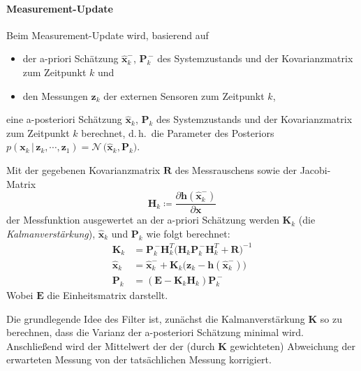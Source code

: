 \documentclass[a4paper, 11pt, accentcolor = tud3b]{tudreport}
\newcommand{\given}{\,\vert\,}
\newcommand{\mat}[1]{\boldsymbol{#1}}
\renewcommand{\vec}[1]{\boldsymbol{#1}}
\renewcommand{\dh}{d.\,h.~}
\begin{document}
					\paragraph{Measurement-Update} %
						Beim Measurement-Update wird, basierend auf
						\begin{itemize}
							\item der a-priori Schätzung \( \hat{\vec{x}}_k^- \), \( \mat{P}_k^{\,-} \) des Systemzustands und der Kovarianzmatrix zum Zeitpunkt \(k\) und
							\item den Messungen \( \vec{z}_k \) der externen Sensoren zum Zeitpunkt \(k\),
						\end{itemize}
						eine a-posteriori Schätzung \( \hat{\vec{x}}_k \), \( \mat{P}_k \) des Systemzustands und der Kovarianzmatrix zum Zeitpunkt \(k\) berechnet, \dh die Parameter des Posteriors \( p(\vec{x}_k \given \vec{z}_k, \cdots, \vec{z}_1) = \mathcal{N}\,\big(\hat{\vec{x}}_k, \mat{P}_k\big) \).
						
						Mit der gegebenen Kovarianzmatrix \( \mat{R} \) des Messrauschens sowie der Jacobi-Matrix
						\begin{equation*}
							\mat{H}_k \coloneqq \frac{\partial \vec{h}(\hat{\vec{x}}_k^-)}{\partial \vec{x}}
						\end{equation*}
						der Messfunktion ausgewertet an der a-priori Schätzung werden \( \mat{K}_k \) (die \emph{Kalmanverstärkung}), \( \hat{\vec{x}}_k \) und \( \mat{P}_k \) wie folgt berechnet:
						\begin{align*}
							\mat{K}_k &= \mat{P}_k^{\,-} \mat{H}_k^T \big( \mat{H}_k \mat{P}_k^{\,-} \mat{H}_k^T + \mat{R} \big)^{-1} \\
							\hat{\vec{x}}_k &= \hat{\vec{x}}_k^- + \mat{K}_k \big( \vec{z}_k - \vec{h}(\hat{\vec{x}}_k^-) \big) \\
							\mat{P}_k &= (\mat{E} - \mat{K}_k \mat{H}_k) \mat{P}_k^{\,-}
						\end{align*}
						Wobei \( \mat{E} \) die Einheitsmatrix darstellt.
						
						Die grundlegende Idee des Filter ist, zunächst die Kalmanverstärkung \( \mat{K} \) so zu berechnen, dass die Varianz der a-posteriori Schätzung minimal wird. Anschließend wird der Mittelwert der der (durch \( \mat{K} \) gewichteten) Abweichung der erwarteten Messung von der tatsächlichen Messung korrigiert.
						
\end{document}

